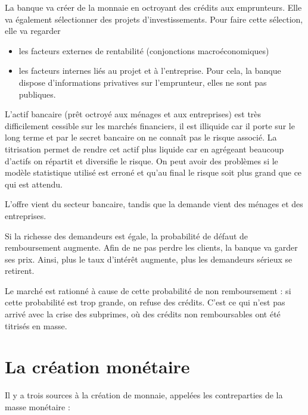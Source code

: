 	La banque va créer de la monnaie en octroyant des crédits aux emprunteurs. Elle va également sélectionner des projets d'investissements. Pour faire cette sélection, elle va regarder
	
	\begin{itemize}
		\item les facteurs externes de rentabilité (conjonctions macroéconomiques)
		\item les facteurs internes liés au projet et à l'entreprise. Pour cela, la banque dispose d'informations privatives sur l'emprunteur, elles ne sont pas publiques.
	\end{itemize}
	
	L'actif bancaire (prêt octroyé aux ménages et aux entreprises) est très difficilement cessible sur les marchés financiers, il est illiquide car il porte sur le long terme et par le secret bancaire on ne connaît pas le risque associé. La titrisation permet de rendre cet actif plus liquide car en agrégeant beaucoup d'actifs on répartit et diversifie le risque. On peut avoir des problèmes si le modèle statistique utilisé est erroné et qu'au final le risque soit plus grand que ce qui est attendu.
	
	
	L'offre vient du secteur bancaire, tandis que la demande vient des ménages et des entreprises.
	
	Si la richesse des demandeurs est égale, la probabilité de défaut de remboursement augmente. Afin de ne pas perdre les clients, la banque va garder ses prix. Ainsi, plus le taux d'intérêt augmente, plus les demandeurs sérieux se retirent.
	
	Le marché est rationné à cause de cette probabilité de non remboursement : si cette probabilité est trop grande, on refuse des crédits. C'est ce qui n'est pas arrivé avec la crise des subprimes, où des crédits non remboursables ont été titrisés en masse.
	
\section{La création monétaire}

Il y a trois sources à la création de monnaie, appelées les contreparties de la masse monétaire :

